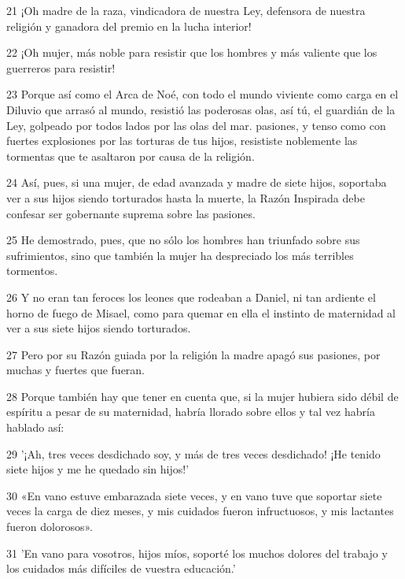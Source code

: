 \par 21 ¡Oh madre de la raza, vindicadora de nuestra Ley, defensora de nuestra religión y ganadora del premio en la lucha interior!

\par 22 ¡Oh mujer, más noble para resistir que los hombres y más valiente que los guerreros para resistir!

\par 23 Porque así como el Arca de Noé, con todo el mundo viviente como carga en el Diluvio que arrasó al mundo, resistió las poderosas olas, así tú, el guardián de la Ley, golpeado por todos lados por las olas del mar. pasiones, y tenso como con fuertes explosiones por las torturas de tus hijos, resististe noblemente las tormentas que te asaltaron por causa de la religión.

\par 24 Así, pues, si una mujer, de edad avanzada y madre de siete hijos, soportaba ver a sus hijos siendo torturados hasta la muerte, la Razón Inspirada debe confesar ser gobernante suprema sobre las pasiones.

\par 25 He demostrado, pues, que no sólo los hombres han triunfado sobre sus sufrimientos, sino que también la mujer ha despreciado los más terribles tormentos.

\par 26 Y no eran tan feroces los leones que rodeaban a Daniel, ni tan ardiente el horno de fuego de Misael, como para quemar en ella el instinto de maternidad al ver a sus siete hijos siendo torturados.

\par 27 Pero por su Razón guiada por la religión la madre apagó sus pasiones, por muchas y fuertes que fueran.

\par 28 Porque también hay que tener en cuenta que, si la mujer hubiera sido débil de espíritu a pesar de su maternidad, habría llorado sobre ellos y tal vez habría hablado así:

\par 29 '¡Ah, tres veces desdichado soy, y más de tres veces desdichado! ¡He tenido siete hijos y me he quedado sin hijos!'

\par 30 «En vano estuve embarazada siete veces, y en vano tuve que soportar siete veces la carga de diez meses, y mis cuidados fueron infructuosos, y mis lactantes fueron dolorosos».

\par 31 'En vano para vosotros, hijos míos, soporté los muchos dolores del trabajo y los cuidados más difíciles de vuestra educación.'

